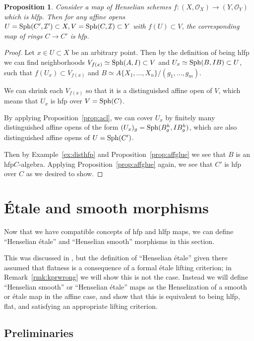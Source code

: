 \documentclass[12pt]{article}
\renewcommand{\O}{\mathscr{O}}
\newcommand{\sph}{{\rm Sph}}
\newcommand{\mc}[1]{\mathcal{#1}}
\newcommand{\Et}{\'etale\xspace}
\newcommand{\hlfp}{hlfp\xspace}
\newcommand{\hfp}{hfp\xspace}
\newtheorem{proposition}[theorem]{Proposition}
\theoremstyle{definition}
\numberwithin{equation}{subsection}
\begin{document}
\begin{proposition}\label{prop:everyaff} Consider a map of Henselian schemes $f: (X,\O_X) \to (Y,\O_Y)$ which is \hlfp. Then for any affine opens $U=\sph(C',\mc{I}') \subset X, V = \sph(C,\mc{I}) \subset Y$ with $f(U) \subset V$, the corresponding map of rings $C \to C'$ is \hfp.
\end{proposition}
\begin{proof}Let $x \in U \subset X$ be an arbitrary point. Then by the definition of being \hlfp we can find neighborhoods $ V_{f(x)} \simeq \sph(A,I) \subset V$ and $U_x \simeq \sph(B,IB) \subset U$, such that $f(U_x) \subset V_{f(x)}$ and $B \simeq A\{X_1,\dots,X_n\}/(g_1,\dots,g_m)$. 

We can shrink each $V_{f(x)}$ so that it is a distinguished affine open of $V$, which means that $U_x$ is \hfp over $V=\sph(C)$.


By applying Proposition~\ref{prop:acl}, we can cover $U_x$ by finitely many distinguished affine opens of the form $(U_x)_g = \sph(B_g^h,IB_g^h)$,  which are also distinguished affine opens of $U=\sph(C')$.

Then by Example~\ref{ex:disthfp} and Proposition~\ref{prop:affglue} we see that $B$ is an \hfp $C$-algebra. Applying Proposition~\ref{prop:affglue} again, we see that $C'$ is \hfp over $C$ as we desired to show.\end{proof}



\section{\'Etale and smooth morphisms}\label{sec:etsm}


Now that we have compatible concepts of \hfp and \hlfp maps, we can define ``Henselian \'etale'' and ``Henselian smooth'' morphisms in this section. 

This was discussed in \cite{cox1,kpr}, but the definition of ``Henselian \'etale'' given there assumed that flatness is a consequence of a formal \Et lifting criterion; in Remark~\ref{rmk:kprwrong} we will show this is not the case. Instead we will define ``Henselian smooth'' or ``Henselian \Et'' maps as the Henselization of a smooth or \Et map in the affine case, and show that this is equivalent to being \hlfp, flat, and satisfying an appropriate lifting criterion.

\subsection{Preliminaries}
\end{document}
